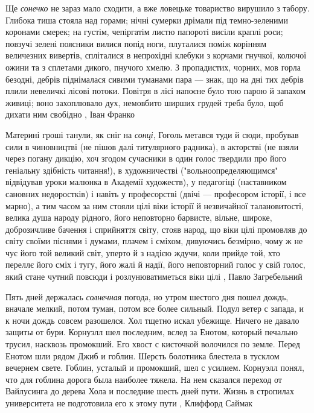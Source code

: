 Ще \emph{сонечко} не зараз мало сходити, а вже ловецьке товариство вирушило з табору.
Глибока тиша стояла над горами; нічні сумерки дрімали під темно-зеленими
коронами смерек; на густім, чепіргатім листю папороті висіли краплі роси;
повзучі зелені поясники вилися попід ноги, плуталися поміж корінням величезних
вивертів, спліталися в непрохідні клебуки з корчами гнучкої, колючої ожини та з
сплетами дикого, пнучого хмелю. З пропадистих, чорних, мов горла безодні,
дебрів піднімалася сивими туманами пара — знак, що на дні тих дебрів плили
невеличкі лісові потоки. Повітря в лісі напоєне було тою парою й запахом
живиці; воно захоплювало дух, немовбито ширших грудей треба було, щоб дихати
ним свобідно
, Іван Франко

Материні гроші танули, як сніг на \emph{сонці}, Гоголь метався туди й сюди, пробував
сили в чиновництві (не пішов далі титулярного радника), в акторстві (не взяли
через погану дикцію, хоч згодом сучасники в один голос твердили про його
геніальну здібність читання!), в художничестві ("вольноопределяющимся"
відвідував уроки малюнка в Академії художеств), у педагогіці (наставником
сановних недоростків) і навіть у професорстві (двічі — професором історії, і
все марно), а тим часом за ним стояли цілі віки історії й незвичайної
талановитості, велика душа народу рідного, його неповторно барвисте, вільне,
широке, доброзичливе бачення і сприйняття світу, стояв народ, що віки цілі
промовляв до світу своїми піснями і думами, плачем і сміхом, дивуючись
безмірно, чому ж не чує його той великий світ, уперто й з надією ждучи, коли
прийде той, хто переллє його сміх і тугу, його жалі й надії, його неповторний
голос у свій голос, який стане чутний повсюди і розлунюватиметься віки цілі
, Павло Загребельний

Пять дней держалась \emph{солнечная} погода, но утром шестого дня пошел дождь,
вначале мелкий, потом туман, потом все более сильный. Подул ветер с запада, и к
ночи дождь совсем разошелся.  Хол тщетно искал убежище. Ничего не давало защиты
от бури. Корнуэлл шел последним, вслед за Енотом, который печально трусил,
насквозь промокший. Его хвост с кисточкой волочился по земле.  Перед Енотом шли
рядом Джиб и гоблин. Шерсть болотника блестела в тусклом вечернем свете.
Гоблин, усталый и промокший, шел с усилием. Корнуэлл понял, что для гоблина
дорога была наиболее тяжела. На нем сказался переход от Вайлусинга до дерева
Хола и последние шесть дней пути. Жизнь в стропилах университета не подготовила
его к этому пути
, Клиффорд Саймак

